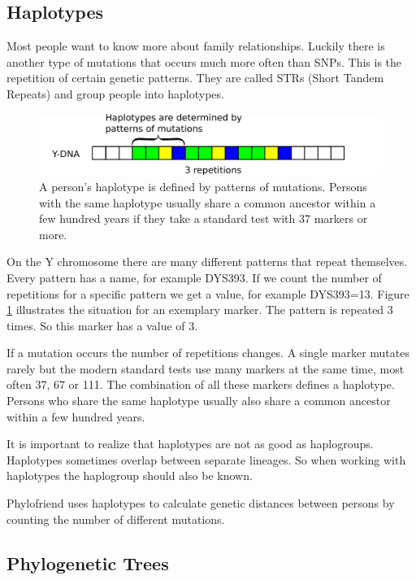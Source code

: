 \subsection{Haplotypes}

Most people want to know more about family relationships.
Luckily there is another type of mutations that occurs much
more often than SNPs. This is the repetition of certain
genetic patterns. They are called STRs (Short Tandem Repeats)
and group people into haplotypes.

\begin{figure}[ht]
\centering
\includegraphics[width=13cm]{img/haplotypes.png}
\caption{\label{haplotype} A person's haplotype is defined
by patterns of mutations. Persons with the same haplotype
usually share a common ancestor within a few hundred years
if they take a standard test with 37 markers or more.}
\end{figure}

On the Y chromosome there are many different patterns that
repeat themselves. Every pattern has a name, for example DYS393.
If we count the number of repetitions for a specific pattern
we get a value, for example DYS393=13. Figure \ref{haplotype}
illustrates the situation for an exemplary marker. The pattern
is repeated 3 times. So this marker has a value of 3.

If a mutation occurs the number of repetitions changes. A 
single marker mutates rarely but the modern standard tests
use many markers at the same time, most often 37, 67 or
111. The combination of all these markers defines
a haplotype. Persons who share the same haplotype usually
also share a common ancestor within a few hundred years.

It is important to realize that haplotypes are not as good
as haplogroups. Haplotypes sometimes overlap between separate
lineages. So when working with haplotypes the haplogroup
should also be known.

Phylofriend uses haplotypes to calculate genetic distances
between persons by counting the number of different mutations.


\subsection{Phylogenetic Trees}

